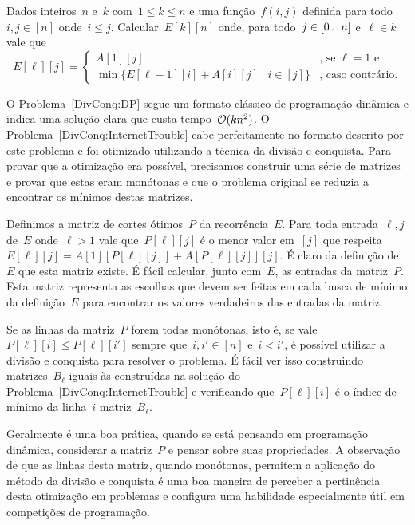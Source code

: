 \begin{prob} \label{DivConq:DP}
Dados inteiros~$n$ e~$k$ com~$1 \leq k \leq n$ e uma função~$f(i,j)$ definida para todo~${ i,j \in [n] }$ onde~$i \leq j$. Calcular~$E[k][n]$ onde, para todo~${ j \in [0 \,.\,.\, n] }$ e~${ \ell \in k }$ vale que
\begin{equation*}
E[\ell][j] = \begin{cases}
A[1][j] & \text{,  se } \ell = 1 \text{ e } \\
\min\{ E[\ell-1][i] + A[i][j] \mid i \in [j] \} & \text{, caso contrário.}
\end{cases}
\end{equation*}
\end{prob}

O Problema~\ref{DivConq:DP} segue um formato clássico de programação dinâmica e indica uma solução clara que custa tempo~$\mathcal{O}(kn^2)$. O Problema~\ref{DivConq:InternetTrouble} cabe perfeitamente no formato descrito por este problema e foi otimizado utilizando a técnica da divisão e conquista. Para provar que a otimização era possível, precisamos construir uma série de matrizes e provar que estas eram monótonas e que o problema original se reduzia a encontrar os mínimos destas matrizes.

Definimos a matriz de cortes ótimos~$P$ da recorrência~$E$. Para toda entrada~$\ell,j$ de~$E$ onde~$\ell > 1$ vale que~$P[\ell][j]$ é o menor valor em~$[j]$ que respeita~${ E[\ell][j] = A[1][P[\ell][j]] + A[P[\ell][j]][j] }$. É claro da definição de~$E$ que esta matriz existe. É fácil calcular, junto com~$E$, as entradas da matriz~$P$. Esta matriz representa as escolhas que devem ser feitas em cada busca de mínimo da definição~$E$ para encontrar os valores verdadeiros das entradas da matriz.

Se as linhas da matriz~$P$ forem todas monótonas, isto é, se vale~${ P[\ell][i] \leq P[\ell][i'] }$ sempre que~${ i,i' \in [n] }$ e~$i < i'$, é possível utilizar a divisão e conquista para resolver o problema. É fácil ver isso construindo matrizes~$B_\ell$ iguais às construídas na solução do Problema~\ref{DivConq:InternetTrouble} e verificando que~$P[\ell][i]$ é o índice de mínimo da linha~$i$ matriz~$B_\ell$.

Geralmente é uma boa prática, quando se está pensando em programação dinâmica, considerar a matriz~$P$ e pensar sobre suas propriedades. A observação de que as linhas desta matriz, quando monótonas, permitem a aplicação do método da divisão e conquista é uma boa maneira de perceber a pertinência desta otimização em problemas e configura uma habilidade especialmente útil em competições de programação.
